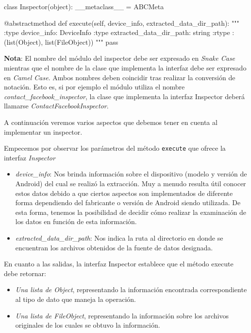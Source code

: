 \begin{python}
class Inspector(object):
   __metaclass__ = ABCMeta

   @abstractmethod
   def execute(self, device_info, extracted_data_dir_path):
       """
       :type device_info: DeviceInfo
       :type extracted_data_dir_path: string
       :rtype : (list(Object), list(FileObject))
       """
       pass
\end{python}

\begin{sloppypar} \textbf{Nota}: El nombre del módulo del inspector debe ser expresado en \emph{Snake Case} mientras que el nombre de la clase que implementa la interfaz debe ser expresado en \emph{Camel Case}. Ambos nombres deben coincidir tras realizar la conversión de notación. Esto es, si por ejemplo el módulo utiliza el nombre \emph{contact\_facebook\_inspector}, la clase que implementa la interfaz Inspector deberá llamarse \emph{ContactFacebookInspector}.
\end{sloppypar}

A continuación veremos varios aspectos que debemos tener en cuenta al implementar un inspector.

Empecemos por observar los parámetros del método \texttt{execute} que ofrece la interfaz \emph{Inspector}

\begin{itemize}
\item \emph{device\_info}: Nos brinda información sobre el dispositivo (modelo y versión de Android) del cual se realizó la extracción. Muy a menudo resulta útil conocer estos datos debido a que ciertos aspectos son implementados de diferente forma dependiendo del fabricante o versión de Android siendo utilizada. De esta forma, tenemos la posibilidad de decidir cómo realizar la examinación de los datos en función de esta información.
\item \emph{extracted\_data\_dir\_path}: Nos indica la ruta al directorio en donde se encuentran los archivos obtenidos de la fuente de datos designada.
\end{itemize}

En cuanto a las salidas, la interfaz Inspector establece que el método execute debe retornar:

\begin{itemize}
\item \emph{Una lista de Object}, representando la información encontrada correspondiente al tipo de dato que maneja la operación.
\item \emph{Una lista de FileObject}, representando la información sobre los archivos originales de los cuales se obtuvo la información.
\end{itemize}

